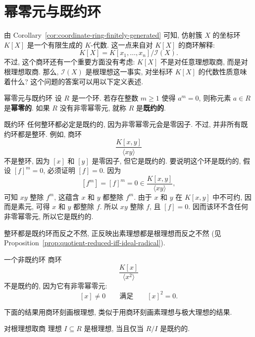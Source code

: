 \section{幂零元与既约环}\label{sec:nilpotents-and-reduced-rings}

由 Corollary~\ref{cor:coordinate-ring-finitely-generated} 可知, 仿射簇 $X$ 的坐标环 $K[X]$ 是一个有限生成的 $K$-代数. 这一点来自对 $K[X]$ 的商环解释:
\[
  K[X]=K[x_{1},\ldots,x_{n}]/\mathcal{I}(X).
\]
不过, 这个商环还有一个重要方面没有考虑: $K[X]$ 不是对任意理想取商, 而是对根理想取商. 那么, $\mathcal{I}(X)$ 是根理想这一事实, 对坐标环 $K[X]$ 的代数性质意味着什么? 这个问题的答案可以用以下定义表述.

\begin{Definition}{幂零元与既约环}\leavevmode\label{def:nilpotent-elements-and-reduced-rings}
  设 $R$ 是一个环. 若存在整数 $m\geq1$ 使得 $a^{m}=0$, 则称元素 $a\in R$ 是\textbf{幂零的}. 如果 $R$ 没有非零幂零元, 就称 $R$ 是\textbf{既约的}.
\end{Definition}

\begin{Example}{既约环}\leavevmode\label{ex:reduced-ring-not-domain}
  任何整环都必定是既约的, 因为非零幂零元会是零因子. 不过, 并非所有既约环都是整环. 例如, 商环
  \[
    \frac{K[x,y]}{\langle xy\rangle}
  \]
  不是整环, 因为 $[x]$ 和 $[y]$ 是零因子, 但它是既约的. 要说明这个环是既约的, 假设 $[f]^{m}=0$, 必须证明 $[f]=0$. 因为
  \[
    [f^{m}]=[f]^{m}=0\in\frac{K[x,y]}{\langle xy\rangle},
  \]
  可知 $xy$ 整除 $f^{m}$, 这蕴含 $x$ 和 $y$ 都整除 $f^{m}$. 由于 $x$ 和 $y$ 在 $K[x,y]$ 中不可约, 因而是素元, 可得 $x$ 和 $y$ 都整除 $f$. 所以 $xy$ 整除 $f$, 且 $[f]=0$. 因而该环不含任何非零幂零元, 所以它是既约的.
\end{Example}

整环都是既约环而反之不然, 正反映出素理想都是根理想而反之不然 (见 Proposition~\ref{prop:quotient-reduced-iff-ideal-radical}).

\begin{Example}{一个非既约环}\leavevmode\label{ex:nonreduced-ring}
  商环
  \[
    \frac{K[x]}{\langle x^{2}\rangle}
  \]
  不是既约的, 因为它有非零幂零元:
  \[
    [x]\ne0\qquad\text{满足}\qquad[x]^{2}=0.
  \]
\end{Example}

下面的结果用商环刻画根理想, 类似于用商环刻画素理想与极大理想的结果.

\begin{Proposition}{对根理想取商}\leavevmode\label{prop:quotient-reduced-iff-ideal-radical}
  理想 $I\subseteq R$ 是根理想, 当且仅当 $R/I$ 是既约的.
\end{Proposition}

